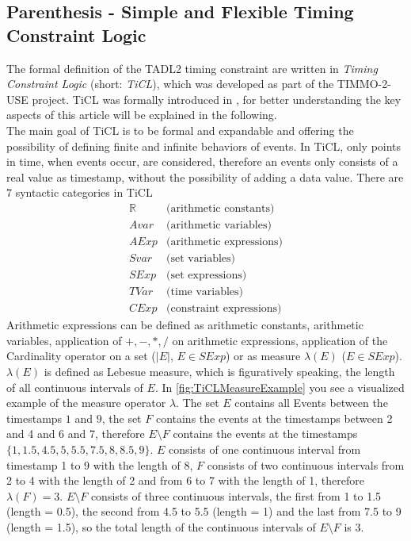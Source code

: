\subsection{Parenthesis - Simple and Flexible Timing Constraint Logic}
	The formal definition of the TADL2 timing constraint are written in \emph{Timing Constraint Logic} (short: \emph{TiCL}), which was developed as part of the TIMMO-2-USE project. TiCL was formally introduced in \cite{TiCL}, for better understanding the key aspects of this article will be explained in the following.\\
	The main goal of TiCL is to be formal and expandable and offering the possibility of defining finite and infinite behaviors of events. In TiCL, only points in time, when events occur, are considered, therefore an events only consists of a real value as timestamp, without the possibility of adding a data value. There are 7 syntactic categories in TiCL
	\begin{align*}
		\mathbb{R} &\text{(arithmetic constants)}\\
		Avar &\text{(arithmetic variables)}\\
		AExp &\text{(arithmetic expressions)}\\[10pt]
		Svar &\text{(set variables)}\\
		SExp &\text{(set expressions)}\\[10pt]
		TVar &\text{(time variables)}\\
		CExp &\text{(constraint expressions)}
	\end{align*}
	Arithmetic expressions can be defined as arithmetic constants, arithmetic variables, application of $+,-,*,/$ on arithmetic expressions, application of the Cardinality operator on a set ($|E|$, $E\in SExp$) or as measure $\lambda(E)$ ($E\in SExp$). $\lambda(E)$ is defined as Lebesue measure, which is figuratively speaking, the length of all continuous intervals of $E$. In \ref{fig:TiCLMeasureExample} you see a visualized example of the measure operator $\lambda$. The set $E$ contains all Events between the timestamps $1$ and $9$, the set $F$ contains the events at the timestamps between 2 and 4 and 6 and 7, therefore $E\setminus F$ contains the events at the timestamps $\{1, 1.5, 4.5, 5, 5.5, 7.5, 8, 8.5, 9\}$.
	$E$ consists of one continuous interval from timestamp 1 to 9 with the length of 8, $F$ consists of two continuous intervals from 2 to 4 with the length of 2 and from 6 to 7 with the length of 1, therefore $\lambda(F)=3$. $E\setminus F$ consists of three continuous intervals, the first from 1 to 1.5 (length = 0.5), the second from 4.5 to 5.5 (length = 1) and the last from 7.5 to 9 (length = 1.5), so the total length of the continuous intervals of $E\setminus F$ is 3.\\
